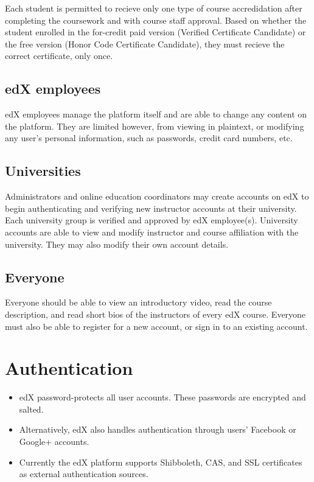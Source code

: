 \documentclass[11pt]{article}
\begin{document}
Each student is permitted to recieve only one type of course accredidation after completing the coursework and with course staff approval. Based on whether the student enrolled in the for-credit paid version (Verified Certificate Candidate) or the free version (Honor Code Certificate Candidate), they must recieve the correct certificate, only once.\\

\subsection{edX employees}
edX employees manage the platform itself and are able to change any content on the platform. They are limited however, from viewing in plaintext, or modifying any user's personal information, such as passwords, credit card numbers, etc.\\

\subsection{Universities}
Administrators and online education coordinators may create accounts on edX to begin authenticating and verifying new instructor accounts at their university. Each university group is verified and approved by edX employee(s). University accounts are able to view and modify instructor and course affiliation with the university. They may also modify their own account details.\\

\subsection{Everyone}
Everyone should be able to view an introductory video, read the course description, and read short bios of the instructors of every edX course. Everyone must also be able to register for a new account, or sign in to an existing account.

\section{Authentication}
\begin{itemize}
\item edX password-protects all user accounts. These passwords are encrypted and salted. 
\item Alternatively, edX also handles authentication through users' Facebook or Google+ accounts.
\item Currently the edX platform supports Shibboleth, CAS, and SSL certificates as external authentication sources.
\end{itemize}
\end{document}
